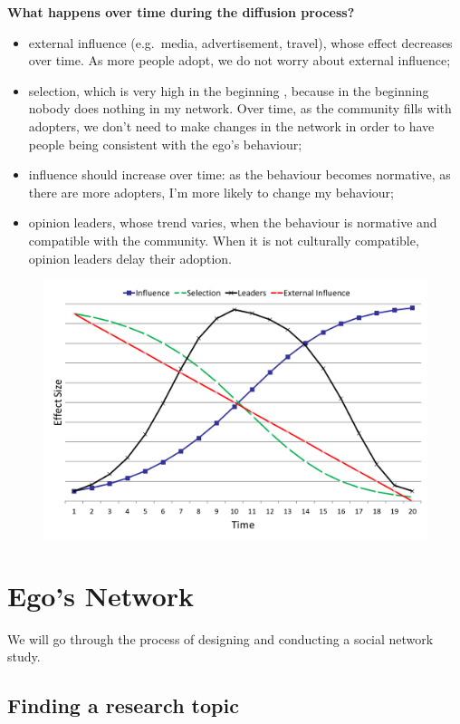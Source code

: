\documentclass[
  notitlepage,
  onecolumn,
  openany]{book}
\providecommand{\tightlist}{%
  \setlength{\itemsep}{0pt}\setlength{\parskip}{0pt}}
\begin{document}
\textbf{What happens over time during the diffusion process?}

\begin{itemize}
\tightlist
\item
  external influence (e.g.~media, advertisement, travel), whose effect decreases over time. As more people adopt, we do not worry about external influence;
\item
  selection, which is very high in the beginning , because in the beginning nobody does nothing in my network. Over time, as the community fills with adopters, we don't need to make changes in the network in order to have people being consistent with the ego's behaviour;
\item
  influence should increase over time: as the behaviour becomes normative, as there are more adopters, I'm more likely to change my behaviour;
\item
  opinion leaders, whose trend varies, when the behaviour is normative and compatible with the community. When it is not culturally compatible, opinion leaders delay their adoption.
\end{itemize}

\begin{figure}[h!]

{\centering \includegraphics[width=0.5\linewidth]{images/14-Christakis and Valente/Untitled 6} 

}

\end{figure}

\hypertarget{egos-network}{%
\chapter{Ego's Network}\label{egos-network}}

We will go through the process of designing and conducting a social network study.

\hypertarget{finding-a-research-topic}{%
\section{Finding a research topic}\label{finding-a-research-topic}}
\end{document}
